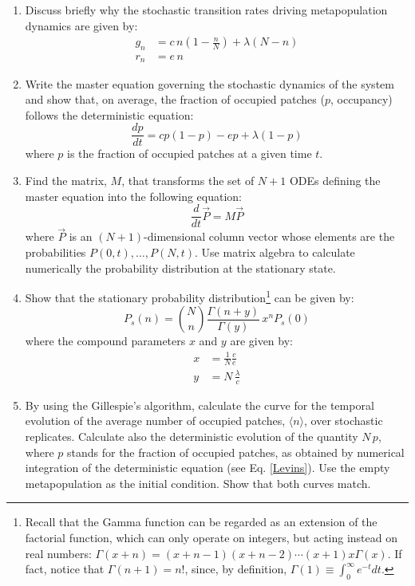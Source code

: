 \begin{enumerate}
\item Discuss briefly why the stochastic transition rates driving metapopulation dynamics are given by:
\begin{align*}
g_n &= c\,n (1 - \frac{n}{N}) + \lambda (N - n) \\
r_n &= e\,n 
\end{align*}
\item Write the master equation governing the stochastic dynamics of the system and show that, on average, the fraction of occupied patches ($p$, occupancy) follows the deterministic equation:
\begin{equation}
\frac{dp}{dt} = c p (1 - p) - e p + \lambda (1-p) 
\label{Levins}
\end{equation}
where $p$ is the fraction of occupied patches at a given time $t$. 
\item Find the matrix, $M$, that transforms the set of $N+1$ ODEs defining the master equation into the following equation:
\begin{equation*}
\frac{d}{dt} \vec{P} = M \vec{P}
\end{equation*}
where $\vec{P}$ is an $(N+1)$-dimensional column vector whose elements are the probabilities $P(0,t), \dots, P(N,t)$. Use matrix algebra to calculate numerically the probability distribution at the stationary state.  
\item Show that the stationary probability distribution\footnote{Recall that the Gamma function can be regarded as an extension of the factorial function, which can only operate on integers, but acting instead on real numbers: $\Gamma(x+n) = (x+n-1)(x+n-2) \cdots (x+1)x\Gamma(x)$. If fact, notice that $\Gamma(n+1) = n!$, since, by definition, $\Gamma(1)\equiv\int_0^{\infty} e^{-t}dt$.} can be given by:
\begin{equation*}
	P_s(n) = \binom{N}{n} \frac{\Gamma(n+y)}{\Gamma(y)} \, x^n P_s(0)
\end{equation*}
where the compound parameters $x$ and $y$ are given by:
\begin{align*}
x  &= \frac{1}{N}\frac{c}{e} \\
y  &= N\,\frac{\lambda}{c}
\end{align*}
\item By using the Gillespie's algorithm, calculate the curve for the temporal evolution of the average number of occupied patches, $\langle n \rangle$, over stochastic replicates. Calculate also the deterministic evolution of the quantity $N\,p$, where $p$ stands for the fraction of occupied patches, as obtained by numerical integration of the deterministic equation (see Eq. \ref{Levins}). Use the empty metapopulation as the initial condition. Show that both curves match.  
\end{enumerate}
